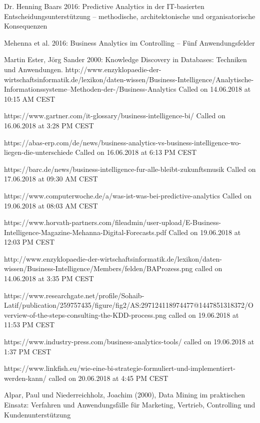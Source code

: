 \documentclass[12pt,twocolumn,twoside]{conference}   %
\begin{document}
\begin{thebibliography}{99}
	Dr. Henning Baars 2016: Predictive Analytics in der IT-basierten Entscheidungsunterstützung – methodische, architektonische und 			organisatorische Konsequenzen

	Mehenna et al. 2016: Business Analytics im Controlling – Fünf Anwendungsfelder

	Martin Ester, Jörg Sander 2000: Knowledge Discovery in Databases: Techniken und Anwendungen. 
http://www.enzyklopaedie-der-wirtschaftsinformatik.de/lexikon/daten-wissen/Business-Intelligence/Analytische-Informationssysteme--Methoden-der-/Business-Analytics
Called on 14.06.2018 at 10:15 AM CEST

 https://www.gartner.com/it-glossary/business-intelligence-bi/ Called on 16.06.2018 at 3:28 PM CEST

https://abas-erp.com/de/news/business-analytics-vs-business-intelligence-wo-liegen-die-unterschiede Called on 16.06.2018 at 6:13 PM CEST

https://barc.de/news/business-intelligence-fur-alle-bleibt-zukunftsmusik
Called on 17.06.2018 at 09:30 AM CEST

https://www.computerwoche.de/a/was-ist-was-bei-predictive-analytics
Called on 19.06.2018 at 08:03 AM CEST

https://www.horvath-partners.com/fileadmin/user-upload/E-Business-Intelligence-Magazine-Mehanna-Digital-Forecasts.pdf
Called on 19.06.2018 at 12:03 PM CEST

http://www.enzyklopaedie-der-wirtschaftsinformatik.de/lexikon/daten-wissen/Business-Intelligence/Members/felden/BAProzess.png
called on 14.06.2018 at 3:35 PM CEST

https://www.researchgate.net/profile/Sohaib-Latif/publication/259757435/figure/fig2/AS:297124118974477@1447851318372/Overview-of-the-steps-consulting-the-KDD-process.png 
called on 19.06.2018 at 11:53 PM CEST

https://www.industry-press.com/business-analytics-tools/
called on 19.06.2018 at 1:37 PM CEST

https://www.linkfish.eu/wie-eine-bi-strategie-formuliert-und-implementiert-werden-kann/
called on 20.06.2018 at 4:45 PM CEST

Alpar, Paul und Niederreichholz, Joachim (2000), Data Mining im praktischen Einsatz: Verfahren und Anwendungsfälle für Marketing, Vertrieb, Controlling und Kundenunterstützung

\end{thebibliography}
\end{document}
